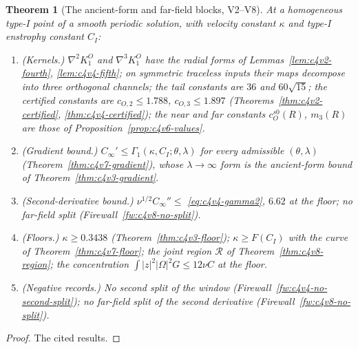 \documentclass[11pt]{article}
\theoremstyle{plain}
\newtheorem{theorem}{Theorem}[section]
\theoremstyle{definition}
\theoremstyle{remark}
\begin{document}
\begin{theorem}[The ancient-form and far-field blocks, V2--V8]
\label{thm:c4v9-blocks}
At a homogeneous type-I point of a smooth periodic solution, with
velocity constant \(\kappa\) and type-I enstrophy constant \(C_I\):
\begin{enumerate}[label=\textup{(\arabic*)},leftmargin=3.2em]
\item (Kernels.)  \(\nabla^2K^O_1\) and \(\nabla^3K^O_1\) have the radial forms of
      Lemmas~\ref{lem:c4v2-fourth}, \ref{lem:c4v4-fifth}; on symmetric traceless
      inputs their maps decompose into three orthogonal channels; the
      tail constants are \(36\) and \(60\sqrt{15}\); the certified constants are
      \(c_{O,2}\le1.788\), \(c_{O,3}\le1.897\) (Theorems~\ref{thm:c4v2-certified},
      \ref{thm:c4v4-certified}); the near and far constants \(c_O^{s0}(R)\), \(m_3(R)\) are
      those of Proposition~\ref{prop:c4v6-values}.
\item (Gradient bound.)  \(C_\infty'\le\Gamma_1(\kappa,C_I;\theta,\lambda)\) for every admissible \((\theta,\lambda)\)
      (Theorem~\ref{thm:c4v7-gradient}), whose \(\lambda\to\infty\) form is the
      ancient-form bound of Theorem~\ref{thm:c4v3-gradient}.
\item (Second-derivative bound.)  \(\nu^{1/2}C_\infty''\le\) \eqref{eq:c4v4-gamma2}, \(6.62\) at the
      floor; no far-field split (Firewall~\ref{fw:c4v8-no-split}).
\item (Floors.)  \(\kappa\ge0.3438\) (Theorem~\ref{thm:c4v3-floor}); \(\kappa\ge F(C_I)\) with the
      curve of Theorem~\ref{thm:c4v7-floor}; the joint region \(\mathcal R\) of
      Theorem~\ref{thm:c4v8-region}; the concentration
      \(\int|z|^2|\Omega|^2G\le12\nu C\) at the floor.
\item (Negative records.)  No second split of the window
      (Firewall~\ref{fw:c4v4-no-second-split}); no far-field split of the
      second derivative (Firewall~\ref{fw:c4v8-no-split}).
\end{enumerate}
\end{theorem}

\begin{proof}
The cited results.
\end{proof}
\end{document}
